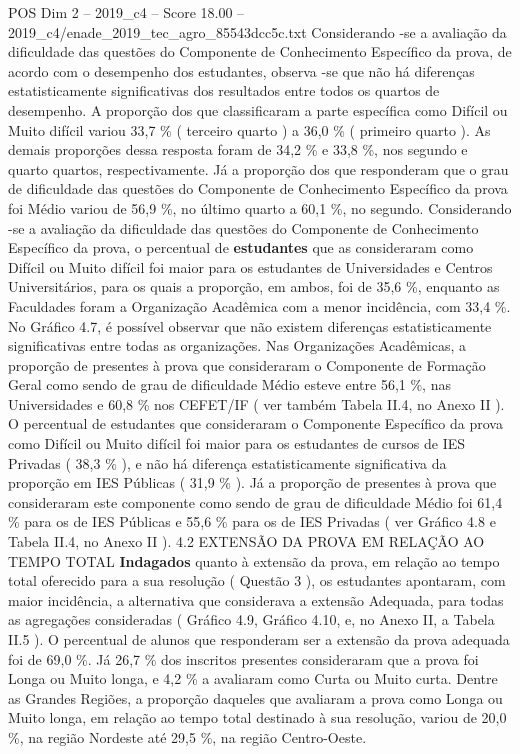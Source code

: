 \begin{textsample}{POS Dim 2 – 2019\_c4 – Score 18.00 – 2019\_c4/enade\_2019\_tec\_agro\_85543dcc5c.txt}
Considerando -se a avaliação da dificuldade das questões do Componente de Conhecimento Específico da prova, de acordo com o desempenho dos estudantes, observa -se que não há diferenças estatisticamente significativas dos resultados entre todos os quartos de desempenho.
A proporção dos que classificaram a parte específica como Difícil ou Muito difícil variou 33,7 \% ( terceiro quarto ) a 36,0 \% ( primeiro quarto ).
As demais proporções dessa resposta foram de 34,2 \% e 33,8 \%, nos segundo e quarto quartos, respectivamente.
Já a proporção dos que responderam que o grau de dificuldade das questões do Componente de Conhecimento Específico da prova foi Médio variou de 56,9 \%, no último quarto a 60,1 \%, no segundo.
Considerando -se a avaliação da dificuldade das questões do Componente de Conhecimento Específico da prova, o percentual de \textbf{estudantes} que as consideraram como Difícil ou Muito difícil foi maior para os estudantes de Universidades e Centros Universitários, para os quais a proporção, em ambos, foi de 35,6 \%, enquanto as Faculdades foram a Organização Acadêmica com a menor incidência, com 33,4 \%.
No Gráfico 4.7, é possível observar que não existem diferenças estatisticamente significativas entre todas as organizações.
Nas Organizações Acadêmicas, a proporção de presentes à prova que consideraram o Componente de Formação Geral como sendo de grau de dificuldade Médio esteve entre 56,1 \%, nas Universidades e 60,8 \% nos CEFET/IF ( ver também Tabela II.4, no Anexo II ).
O percentual de estudantes que consideraram o Componente Específico da prova como Difícil ou Muito difícil foi maior para os estudantes de cursos de IES Privadas ( 38,3 \% ), e não há diferença estatisticamente significativa da proporção em IES Públicas ( 31,9 \% ).
Já a proporção de presentes à prova que consideraram este componente como sendo de grau de dificuldade Médio foi 61,4 \% para os de IES Públicas e 55,6 \% para os de IES Privadas ( ver Gráfico 4.8 e Tabela II.4, no Anexo II ). 4.2 EXTENSÃO DA PROVA EM RELAÇÃO AO TEMPO TOTAL \textbf{Indagados} quanto à extensão da prova, em relação ao tempo total oferecido para a sua resolução ( Questão 3 ), os estudantes apontaram, com maior incidência, a alternativa que considerava a extensão Adequada, para todas as agregações consideradas ( Gráfico 4.9, Gráfico 4.10, e, no Anexo II, a Tabela II.5 ).
O percentual de alunos que responderam ser a extensão da prova adequada foi de 69,0 \%.
Já 26,7 \% dos inscritos presentes consideraram que a prova foi Longa ou Muito longa, e 4,2 \% a avaliaram como Curta ou Muito curta.
Dentre as Grandes Regiões, a proporção daqueles que avaliaram a prova como Longa ou Muito longa, em relação ao tempo total destinado à sua resolução, variou de 20,0 \%, na região Nordeste até 29,5 \%, na região Centro-Oeste.

\end{textsample}
